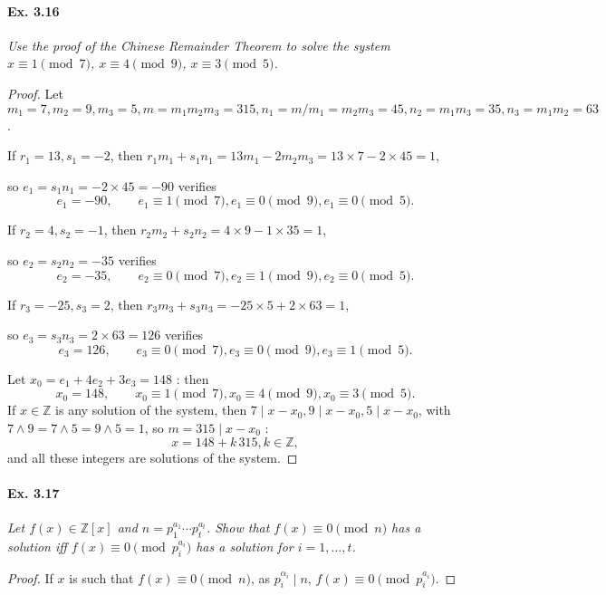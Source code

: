 \documentclass[11pt,a4paper]{article}
\newcommand{\Z}{\mathbb{Z}}
\begin{document}
{\paragraph{Ex. 3.16}

{\it Use the proof of the Chinese Remainder Theorem to solve the system $x \equiv 1 \pmod 7$, $x \equiv 4 \pmod 9$, $x \equiv 3 \pmod 5$.
}

\begin{proof} Let $m_1 = 7,m_2=9,m_3 = 5, m = m_1m_2m_3 = 315, n_1 = m/m_1= m_2m_3=45, n_2 = m_1m_3 = 35, n_3= m_1m_2 = 63$.

If $r_1 = 13, s_1 = -2$, then $r_1m_1+s_1n_1 = 13 m_1 -2m_2m_3 = 13\times 7 -2 \times 45 = 1$,

so $e_1 = s_1n_1 = -2\times 45 = -90$ verifies $$e_1 = -90,\qquad e_1\equiv 1 \pmod 7, e_1 \equiv 0 \pmod 9, e_1 \equiv 0 \pmod 5.$$

If $r_2 = 4,s_2 = -1$, then $r_2m_2+s_2n_2 = 4\times9 - 1\times 35 = 1$,

so $ e_2 = s_2n_2 = -35$ verifies $$e_2 = -35, \qquad e_2 \equiv 0 \pmod 7, e_2 \equiv 1 \pmod 9, e_2 \equiv 0 \pmod 5.$$

If $r_3 = -25,s_3 = 2$, then $r_3m_3 +s_3n_3 = -25\times 5 + 2\times 63 = 1$,

so  $ e_3 = s_3 n _3 = 2\times 63 = 126$ verifies $$e_3 = 126, \qquad e_3\equiv 0\pmod 7, e_3 \equiv 0 \pmod 9, e_3 \equiv 1 \pmod 5.$$

Let $x_0 = e_1 + 4 e_2 + 3 e_3 = 148 $ : then 
$$x_0 = 148,\qquad x_0 \equiv 1 \pmod 7, x_0 \equiv 4 \pmod 9, x_0 \equiv 3 \pmod 5.$$
If $x\in \Z$ is any solution of the system, then $7 \mid x-x_0, 9 \mid x-x_0, 5 \mid x-x_0$, with $7\wedge 9 = 7 \wedge 5 = 9 \wedge 5 = 1$, so $m = 315 \mid x - x_0$ : 
$$x = 148 + k\, 315, k \in \Z,$$
and all these integers are solutions of the system.
\end{proof}

\paragraph{Ex. 3.17}

{\it Let $f(x) \in \Z[x]$ and $n = p_1^{a_1} \cdots p_t^{a_t}$. Show that $f(x) \equiv 0 \pmod n$ has a solution iff $f(x) \equiv 0 \pmod {p_i^{a_i}}$ has a solution for $i = 1, \ldots, t$.
}

\begin{proof}
If $x$ is such that $f(x) \equiv 0 \pmod n$, as $p_i^{\alpha_i} \mid n$, $f(x) \equiv 0 \pmod{p_i^{a_i}}$.


\end{proof}}
\end{document}
